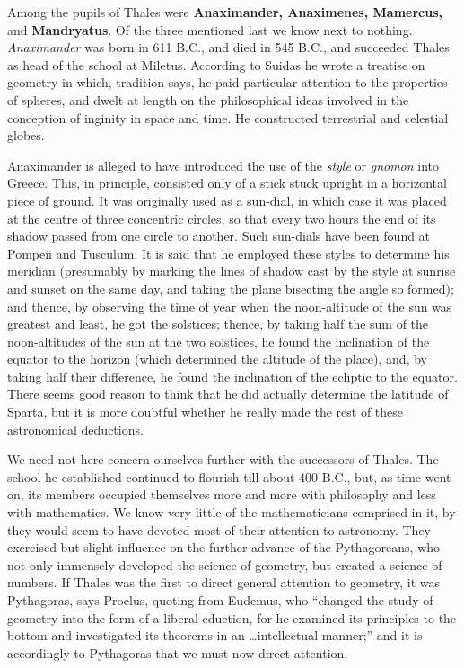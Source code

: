 \documentclass[12pt,oneside]{book}
\begin{document}
Among the pupils of Thales were \textbf{Anaximander, Anaximenes, Mamercus,} and \textbf{Mandryatus}. Of the three mentioned last we know next to nothing. \textit{Anaximander} was born in 611 B.C., and died in 545 B.C., and succeeded Thales as head of the school at Miletus. According to Suidas he wrote a treatise on geometry in which, tradition says, he paid particular attention to the properties of spheres, and dwelt at length on the philosophical ideas involved in the conception of inginity in space and time. He constructed terrestrial and celestial globes. \par 

Anaximander is alleged to have introduced the use of the \textit{style} or \textit{gnomon} into Greece. This, in principle, consisted only of a stick stuck upright in a horizontal piece of ground. It was originally used as a sun-dial, in which case it was placed at the centre of three concentric circles, so that every two hours the end of its shadow passed from one circle to another. Such sun-dials have been found at Pompeii and Tusculum. It is said that he employed these styles to determine his meridian (presumably by marking the lines of shadow cast by the style at sunrise and sunset on the same day, and taking the plane bisecting the angle so formed); and thence, by observing the time of year when the noon-altitude of the sun was greatest and least, he got the solstices; thence, by taking half the sum of the noon-altitudes of the sun at the two solstices, he found the inclination of the equator to the horizon (which determined the altitude of the place), and, by taking half their difference, he found the inclination of the ecliptic to the equator. There seems good reason to think that he did actually determine the latitude of Sparta, but it is more doubtful whether he really made the rest of these astronomical deductions. \par 

We need not here concern ourselves further with the successors of Thales. The school he established continued to flourish till about 400 B.C., but, as time went on, its members occupied themselves more and more with philosophy and less with mathematics. We know very little of the mathematicians comprised in it, by they would seem to have devoted most of their attention to astronomy. They exercised but slight influence on the further advance of the Pythagoreans, who not only immensely developed the science of geometry, but created a science of numbers. If Thales was the first to direct general attention to geometry, it was Pythagoras, says Proclus, quoting from Eudemus, who ``changed the study of geometry into the form of a liberal eduction, for he examined its principles to the bottom and investigated its theorems in an \dots intellectual manner;'' and it is accordingly to Pythagoras that we must now direct attention. \par 
\end{document}
